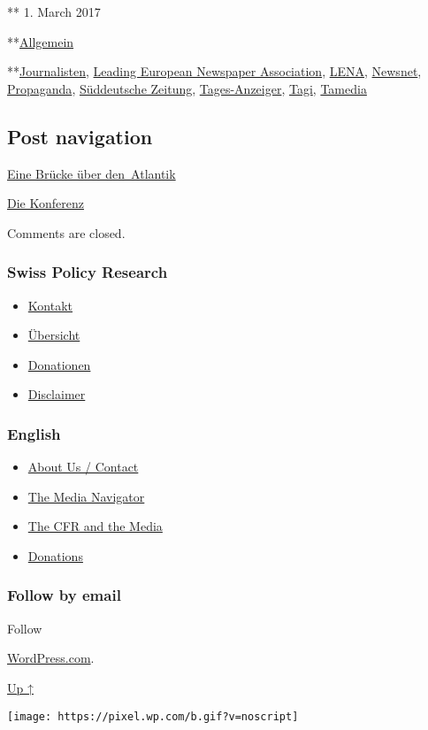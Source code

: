 ** 1. March 2017

**\href{https://swprs.org/category/allgemein/}{Allgemein}

**\href{https://swprs.org/tag/journalisten/}{Journalisten},
\href{https://swprs.org/tag/leading-european-newspaper-association/}{Leading
European Newspaper Association},
\href{https://swprs.org/tag/lena/}{LENA},
\href{https://swprs.org/tag/newsnet/}{Newsnet},
\href{https://swprs.org/tag/propaganda/}{Propaganda},
\href{https://swprs.org/tag/sueddeutsche-zeitung/}{Süddeutsche Zeitung},
\href{https://swprs.org/tag/tages-anzeiger/}{Tages-Anzeiger},
\href{https://swprs.org/tag/tagi/}{Tagi},
\href{https://swprs.org/tag/tamedia/}{Tamedia}

\hypertarget{post-navigation}{%
\subsection{Post navigation}\label{post-navigation}}

\href{https://swprs.org/2017/03/01/eine-bruecke-ueber-den-atlantik/}{Eine
Brücke über den~Atlantik}

\href{https://swprs.org/2017/03/01/schweizer-medien-bilderberg-konferenz/}{Die
Konferenz}

Comments are closed.

\hypertarget{swiss-policy-research}{%
\subsubsection{Swiss Policy Research}\label{swiss-policy-research}}

\begin{itemize}
\tightlist
\item
  \href{https://swprs.org/kontakt/}{Kontakt}
\item
  \href{https://swprs.org/uebersicht/}{Übersicht}
\item
  \href{https://swprs.org/donationen/}{Donationen}
\item
  \href{https://swprs.org/disclaimer/}{Disclaimer}
\end{itemize}

\hypertarget{english}{%
\subsubsection{English}\label{english}}

\begin{itemize}
\tightlist
\item
  \href{https://swprs.org/contact/}{About Us / Contact}
\item
  \href{https://swprs.org/media-navigator/}{The Media Navigator}
\item
  \href{https://swprs.org/the-american-empire-and-its-media/}{The CFR
  and the Media}
\item
  \href{https://swprs.org/donations/}{Donations}
\end{itemize}

\hypertarget{follow-by-email}{%
\subsubsection{Follow by email}\label{follow-by-email}}

Follow

\href{https://wordpress.com/?ref=footer_custom_com}{WordPress.com}.

\protect\hyperlink{}{Up ↑}

\texttt{[image: https://pixel.wp.com/b.gif?v=noscript]}
